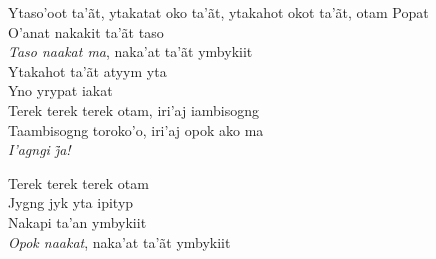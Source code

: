 \noindent   Ytaso'oot ta'ãt, ytakatat oko ta'ãt, ytakahot okot ta'ãt, otam Popat\\
  O'anat nakakit ta'ãt taso\\
  \textit{Taso naakat ma}, naka'at ta'ãt ymbykiit\\
  Ytakahot ta'ãt atyym yta\\
  Yno yrypat iakat\\
  Terek terek terek otam, iri'aj iambisogng\\
  Taambisogng toroko'o, iri'aj opok ako ma\\
  \textit{I’agngi j̃a!}

\smallskip
 \begin{center}\end{center}
 \smallskip

\noindent   Terek terek terek otam\\
  Jygng jyk yta ipityp\\
  Nakapi ta'an ymbykiit\\
  \textit{Opok naakat}, naka'at ta'ãt ymbykiit

\smallskip
 \begin{center}\end{center}
 \smallskip

